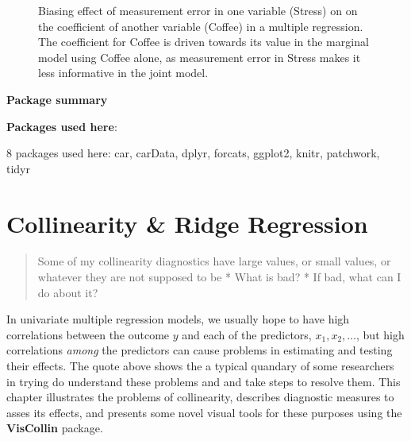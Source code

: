 \documentclass[
  letterpaper,
  10pt,
  krantz2]{krantz}
\begin{document}
\begin{figure}


\caption{\label{fig-coffee-measerr}Biasing effect of measurement error
in one variable (Stress) on on the coefficient of another variable
(Coffee) in a multiple regression. The coefficient for Coffee is driven
towards its value in the marginal model using Coffee alone, as
measurement error in Stress makes it less informative in the joint
model.}

\end{figure}%

\textbf{Package summary}

\textbf{Packages used here}:

8 packages used here: car, carData, dplyr, forcats, ggplot2, knitr,
patchwork, tidyr

\chapter{Collinearity \& Ridge Regression}\label{sec-collin}

\begin{quote}
Some of my collinearity diagnostics have large values, or small values,
or whatever they are not supposed to be * What is bad? * If bad, what
can I do about it?
\end{quote}

In univariate multiple regression models, we usually hope to have high
correlations between the outcome \(y\) and each of the predictors,
\(x_1, x_2, \dots\), but high correlations \emph{among} the predictors
can cause problems in estimating and testing their effects. The quote
above shows the a typical quandary of some researchers in trying do
understand these problems and and take steps to resolve them. This
chapter illustrates the problems of collinearity, describes diagnostic
measures to asses its effects, and presents some novel visual tools for
these purposes using the \textbf{VisCollin} package.
\end{document}
